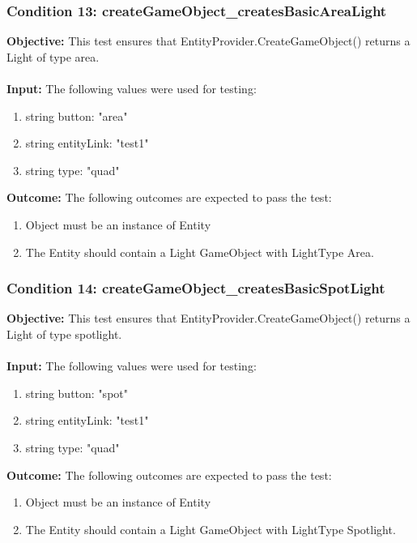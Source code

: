 \documentclass[a4paper,12pt]{article}
\begin{document}
		\subsubsection{Condition 13: createGameObject\_createsBasicAreaLight}
			\textbf{Objective:} This test ensures that EntityProvider.CreateGameObject() returns a Light of type area.\\\\
			\textbf{Input:} The following values were used for testing:
				\begin{enumerate}
					\item string button: "area"
					\item string entityLink: "test1"
					\item string type: "quad"
				\end{enumerate}
			\textbf{Outcome:} The following outcomes are expected to pass the test:
				\begin{enumerate}
					\item Object must be an instance of Entity
					\item The Entity should contain a Light GameObject with LightType Area.
				\end{enumerate}
		\subsubsection{Condition 14: createGameObject\_createsBasicSpotLight}
			\textbf{Objective:} This test ensures that EntityProvider.CreateGameObject() returns a Light of type spotlight.\\\\
			\textbf{Input:} The following values were used for testing:
				\begin{enumerate}
					\item string button: "spot"
					\item string entityLink: "test1"
					\item string type: "quad"
				\end{enumerate}
			\textbf{Outcome:} The following outcomes are expected to pass the test:
				\begin{enumerate}
					\item Object must be an instance of Entity
					\item The Entity should contain a Light GameObject with LightType Spotlight.
				\end{enumerate}
\end{document}
